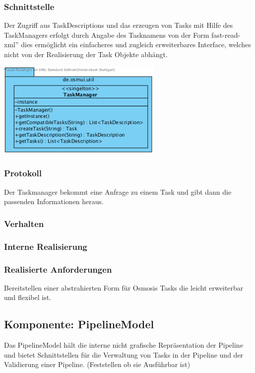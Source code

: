 \documentclass[a4paper,12pt]{scrartcl}
\begin{document}
\subsubsection{Schnittstelle}
Der Zugriff aus TaskDescriptions und das erzeugen von Tasks mit Hilfe des TaskManagers erfolgt durch Angabe des Tasknamens
von der Form \glqq fast-read-xml'' dies ermöglicht ein einfacheres und zugleich erweiterbares Interface, welches nicht von der Realisierung der Task Objekte abhängt.
\begin{center}
\includegraphics[width=8cm]{Schnittstelle_TaskManager.png}
\end{center}
\subsubsection{Protokoll}
Der Taskmanager bekommt eine Anfrage zu einem Task und gibt dann die passenden Informationen heraus.
\subsubsection{Verhalten}
\subsubsection{Interne Realisierung}
\subsubsection{Realisierte Anforderungen}
Bereitstellen einer abstrahierten Form für Osmosis Tasks die leicht erweiterbar und flexibel ist.

\newpage
\subsection{Komponente: PipelineModel}
Das PipelineModel hält die interne nicht grafische Repräsentation der Pipeline und bietet Schnittstellen für die Verwaltung von Tasks in der Pipeline und der Validierung einer Pipeline. (Feststellen ob sie Ausführbar ist)
\end{document}
